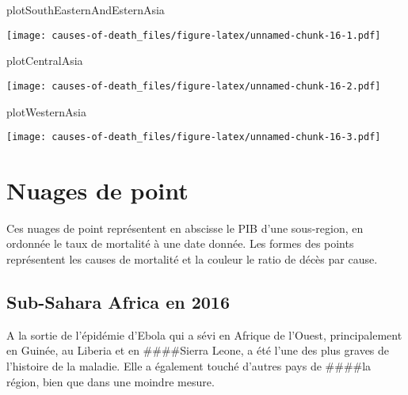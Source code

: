 \documentclass[
]{article}
\newenvironment{Shaded}{\begin{snugshade}}{\end{snugshade}}
\newcommand{\NormalTok}[1]{#1}
\begin{document}
\begin{Shaded}
\begin{Highlighting}[]
\NormalTok{plotSouthEasternAndEsternAsia}
\end{Highlighting}
\end{Shaded}

\texttt{[image: causes-of-death\_files/figure-latex/unnamed-chunk-16-1.pdf]}

\begin{Shaded}
\begin{Highlighting}[]
\NormalTok{plotCentralAsia}
\end{Highlighting}
\end{Shaded}

\texttt{[image: causes-of-death\_files/figure-latex/unnamed-chunk-16-2.pdf]}

\begin{Shaded}
\begin{Highlighting}[]
\NormalTok{plotWesternAsia}
\end{Highlighting}
\end{Shaded}

\texttt{[image: causes-of-death\_files/figure-latex/unnamed-chunk-16-3.pdf]}

\hypertarget{nuages-de-point}{%
\section{Nuages de point}\label{nuages-de-point}}

Ces nuages de point représentent en abscisse le PIB d'une sous-region,
en ordonnée le taux de mortalité à une date donnée. Les formes des
points représentent les causes de mortalité et la couleur le ratio de
décès par cause.

\hypertarget{sub-sahara-africa-en-2016}{%
\subsection{Sub-Sahara Africa en 2016}\label{sub-sahara-africa-en-2016}}

A la sortie de l'épidémie d'Ebola qui a sévi en Afrique de l'Ouest,
principalement en Guinée, au Liberia et en \#\#\#\#Sierra Leone, a été
l'une des plus graves de l'histoire de la maladie. Elle a également
touché d'autres pays de \#\#\#\#la région, bien que dans une moindre
mesure.
\end{document}
